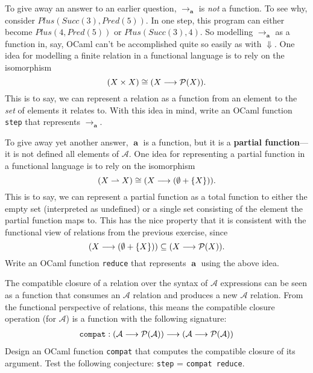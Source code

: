 \documentclass[11pt]{article}
\newcommand{\deftech}[1]{\textbf{#1}}
\newcommand{\syntax}[1]{{\tt #1}}
\newcommand\Plus{\mathit{Plus}}
\newcommand\Succ{\mathit{Succ}}
\newcommand\Pred{\mathit{Pred}}
\newcommand\reduce{\mathop{\mathbf{a}}}
\newcommand\step{\rightarrow_\mathbf{a}}
\newcommand\Arith{\mathcal{A}}
\begin{document}
\begin{exercise}
To give away an answer to an earlier question, $\step$ is \emph{not} a
function.  To see why, consider $\Plus(\Succ(3),\Pred(5))$.  In one
step, this program can either become $\Plus(4,\Pred(5))$ or
$\Plus(\Succ(3),4)$.  So modelling $\step$ as a function in, say,
OCaml can't be accomplished quite so easily as with $\Downarrow$.  One
idea for modelling a finite relation in a functional language is to
rely on the isomorphism 
\[
(X \times X) \cong (X \longrightarrow \mathcal{P}(X))\text.
\]
This is to say, we can represent a relation as a function from
an element to the \emph{set} of elements it relates to.
%
With this idea in mind, write an OCaml function \syntax{step} that
represents $\step$.
\end{exercise}

\begin{exercise}
To give away yet another answer, $\reduce$ is a function, but it is a
\deftech{partial function}---it is not defined all elements of
$\Arith$.  One idea for representing a partial function in a
functional language is to rely on the isomorphism
\[
(X \rightharpoonup X) \cong (X \longrightarrow (\emptyset + \{X\}))\text.
\]
This is to say, we can represent a partial function as a total
function to either the empty set (interpreted as undefined) or a
single set consisting of the element the partial function maps to.
This has the nice property that it is consistent with the functional
view of relations from the previous exercise, since
\[
(X \longrightarrow (\emptyset + \{X\})) \subseteq 
(X \longrightarrow \mathcal{P}(X))\text.
\]
Write an OCaml function \syntax{reduce} that represents $\reduce$
using the above idea.
\end{exercise}

\begin{exercise}
The compatible closure of a relation over the syntax of $\Arith$
expressions can be seen as a function that consumes an $\Arith$
relation and produces a new $\Arith$ relation. From the functional
perspective of relations, this means the compatible closure operation
(for $\Arith$) is a function with the following signature:
\begin{align*}
\syntax{compat} : (\Arith \longrightarrow \mathcal{P}(\Arith)) \longrightarrow (\Arith \longrightarrow \mathcal{P}(\Arith))
\end{align*}
%
Design an OCaml function \syntax{compat} that computes the compatible
closure of its argument.  Test the following conjecture: \syntax{step}
= \syntax{compat reduce}.
\end{exercise}
\end{document}
